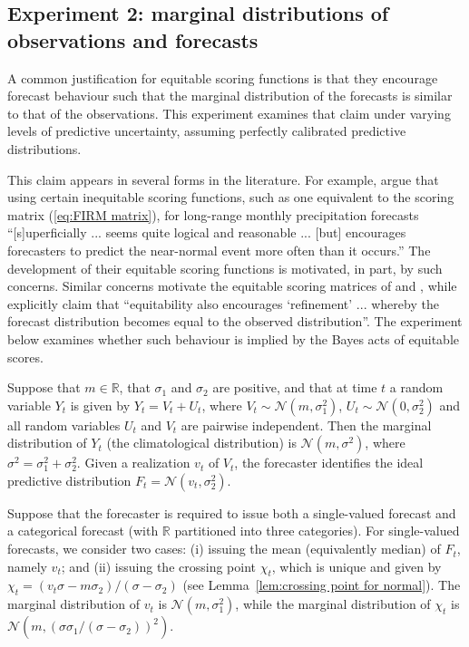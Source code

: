 \documentclass[10pt]{article} %
\theoremstyle{theorem}
\theoremstyle{definition}
\newcommand{\RRR}{\mathbb{R}}
\newcommand{\cN}{\mathcal{N}}
\begin{document}
\subsection{Experiment 2: marginal distributions of observations and forecasts}\label{ss:exp2}

A common justification for equitable scoring functions is that they encourage forecast behaviour such that the marginal distribution of the forecasts is similar to that of the observations. This experiment examines that claim under varying levels of predictive uncertainty, assuming perfectly calibrated predictive distributions.

This claim appears in several forms in the literature. For example, \citet{gandin1992equitable} argue that using certain inequitable scoring functions, such as one equivalent to the scoring matrix (\ref{eq:FIRM matrix}), for long-range monthly precipitation forecasts ``[s]uperficially ... seems quite logical and reasonable ... [but] encourages forecasters to predict the near-normal event more often than it occurs.'' The development of their equitable scoring functions is motivated, in part, by such concerns. Similar concerns motivate the equitable scoring matrices of \citet{folland1986experimental} and \citet{potts1996revised}, while \citet{rodwell2010new} explicitly claim that ``equitability also encourages `refinement' ... whereby the forecast distribution becomes equal to the observed distribution''. The experiment below examines whether such behaviour is implied by the Bayes acts of equitable scores.

Suppose that $m\in\RRR$, that $\sigma_1$ and $\sigma_2$ are positive, and that at time $t$ a random variable $Y_t$ is given by $Y_t=V_t+U_t$, where $V_t\sim \cN(m,\sigma_1^2)$, $U_t\sim \cN(0,\sigma_2^2)$ and all random variables $U_t$ and $V_t$ are pairwise independent. Then the marginal distribution of $Y_t$ (the climatological distribution) is $\cN(m, \sigma^2)$, where $\sigma^2 = \sigma_1^2 + \sigma_2^2$. Given a realization $v_t$ of $V_t$, the forecaster identifies the ideal predictive distribution $F_t = \cN(v_t, \sigma_2^2)$.

Suppose that the forecaster is required to issue both a single-valued forecast and a categorical forecast (with $\RRR$ partitioned into three categories). For single-valued forecasts, we consider two cases: (i) issuing the mean (equivalently median) of $F_t$, namely $v_t$; and (ii) issuing the crossing point $\chi_t$, which is unique and given by $\chi_t = (v_t\sigma - m\sigma_2)/(\sigma - \sigma_2)$ (see Lemma~\ref{lem:crossing point for normal}). The marginal distribution of $v_t$ is $\cN(m,\sigma_1^2)$, while the marginal distribution of $\chi_t$ is $\cN(m,(\sigma\sigma_1/(\sigma-\sigma_2))^2)$.
\end{document}
